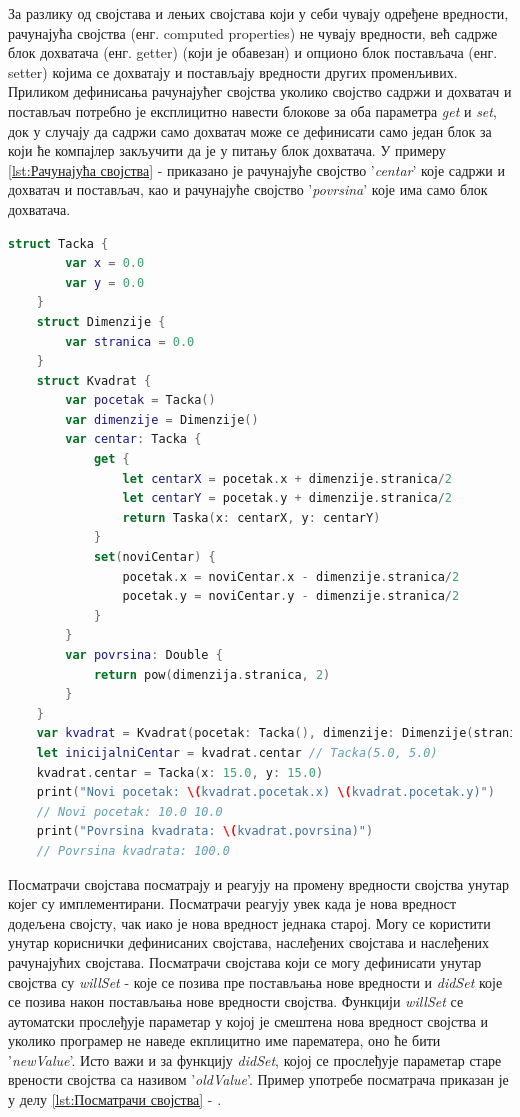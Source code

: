 \documentclass[12pt,oneside]{memoir}
\begin{document}
\indent За разлику од својстава и лењих својстава који у себи чувају одређене вредности, рачунајућа својства (енг. computed properties) не чувају вредности, већ садрже блок дохватача (енг. getter) (који је обавезан) и опционо блок постављача (енг. setter) којима се дохватају и постављају вредности других променљивих. Приликом дефинисања рачунајућег својства уколико својство садржи и дохватач и постављач потребно је експлицитно навести блокове за оба параметра \textit{get} и \textit{set}, док у случају да садржи само дохватач може се дефинисати само један блок за који ће компајлер закључити да је у питању блок дохватача. У примеру \ref{lst:Рачунајућа својства} -  приказано је рачунајуће својство '\textit{centar}' које садржи и дохватач и постављач, као и рачунајуће својство '\textit{povrsina}' које има само блок дохватача.

\begin{lstlisting}[caption=\textit{{Рачунајућа својства}}, label={lst:Рачунајућа својства}, language=Swift, frame=single]
    struct Tacka {
        var x = 0.0
        var y = 0.0
    }
    struct Dimenzije {
        var stranica = 0.0
    }
    struct Kvadrat {
        var pocetak = Tacka()
        var dimenzije = Dimenzije()
        var centar: Tacka {
            get {
                let centarX = pocetak.x + dimenzije.stranica/2
                let centarY = pocetak.y + dimenzije.stranica/2
                return Taska(x: centarX, y: centarY)
            }
            set(noviCentar) {
                pocetak.x = noviCentar.x - dimenzije.stranica/2
                pocetak.y = noviCentar.y - dimenzije.stranica/2
            }
        }
        var povrsina: Double {
            return pow(dimenzija.stranica, 2)
        }
    }
    var kvadrat = Kvadrat(pocetak: Tacka(), dimenzije: Dimenzije(stranica: 10.0))
    let inicijalniCentar = kvadrat.centar // Tacka(5.0, 5.0)
    kvadrat.centar = Tacka(x: 15.0, y: 15.0)
    print("Novi pocetak: \(kvadrat.pocetak.x) \(kvadrat.pocetak.y)")
    // Novi pocetak: 10.0 10.0
    print("Povrsina kvadrata: \(kvadrat.povrsina)")
    // Povrsina kvadrata: 100.0
\end{lstlisting}

\indent Посматрачи својстава посматрају и реагују на промену вредности својства унутар којег су имплементирани. Посматрачи реагују увек када је нова вредност додељена својсту, чак иако је нова вредност једнака старој. Могу се користити унутар кориснички дефинисаних својстава, наслеђених својстава и наслеђених рачунајућих својстава. Посматрачи својстава који се могу дефинисати унутар својства су \textit{willSet} - које се позива пре постављања нове вредности и \textit{didSet} које се позива након постављања нове вредности својства. Функцији \textit{willSet} се аутоматски прослеђује параметар у којој је смештена нова вредност својства и уколико програмер не наведе екплицитно име парематера, оно ће бити '\textit{newValue}'. Исто важи и за функцију \textit{didSet}, којој се прослеђује параметар старе врености својства са називом '\textit{oldValue}'. Пример употребе посматрача приказан је у делу \ref{lst:Посматрачи својства} - .
\end{document}
